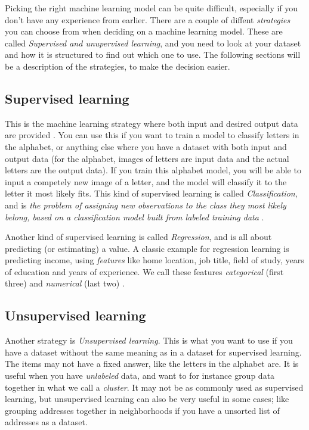 Picking the right machine learning model can be quite difficult, especially if you don't have any experience from earlier. 
There are a couple of diffent \textit{strategies} you can choose from when deciding on a machine learning model.
These are called \textit{Supervised and unupervised learning}, and you need to look at your dataset and how it is structured to find out 
which one to use. The following sections will be a description of the strategies, to make the decision easier.

\subsection{Supervised learning}
This is the machine learning strategy where both input and desired output data are provided \cite{supervised_learning_intro}. 
You can use this if you want to train a model to classify letters in the alphabet, or anything else where you have a dataset 
with both input and output data (for the alphabet, images of letters are input data and the actual letters are the output data).
If you train this alphabet model, you will be able to input a competely new image of a letter, and the model will classify it to 
the letter it most likely fits. This kind of supervised learning is called \textit{Classification}, and is 
\textit{the problem of assigning new observations to the class they most likely belong, based on a classification model built from labeled training data} 
\cite{machine_learning_for_humans_supervised_2}.

Another kind of supervised learning is called \textit{Regression}, and is all about predicting (or estimating) a value. 
A classic example for regression learning is predicting income, using \textit{features} like home location, job title, field of study,  
years of education and years of experience. We call these features \textit{categorical} (first three) and \textit{numerical} (last two) 
\cite{machine_learning_for_humans_supervised_1}. 

\subsection{Unsupervised learning}
Another strategy is \textit{Unsupervised learning}. This is what you want to use if you have a dataset without the same meaning 
as in a dataset for supervised learning. The items may not have a fixed answer, like the letters in the alphabet are. 
It is useful when you have \textit{unlabeled} data, and want to for instance group data together in what we call a \textit{cluster}.
It may not be as commonly used as supervised learning, but unsupervised learning can also be very useful in some cases; like grouping addresses together
in neighborhoods if you have a unsorted list of addresses as a dataset.

